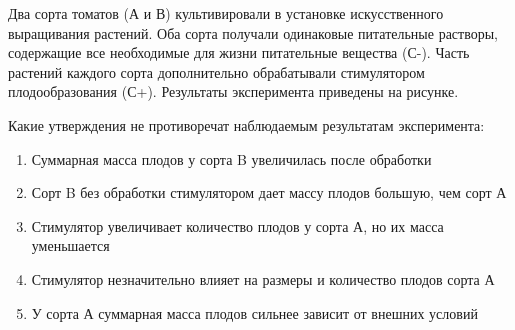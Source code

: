 
Два сорта томатов (А и В) культивировали в
установке искусственного выращивания растений. Оба сорта получали одинаковые
питательные растворы, содержащие все необходимые для жизни питательные вещества
(С-). Часть растений каждого сорта дополнительно обрабатывали стимулятором
плодообразования (С+). Результаты эксперимента приведены на рисунке.


Какие утверждения не противоречат
наблюдаемым результатам эксперимента:

\begin{enumerate}
    \item Суммарная масса плодов у сорта B увеличилась после обработки
    \item Сорт B без обработки стимулятором дает массу плодов большую, чем сорт А
    \item Стимулятор увеличивает количество плодов у сорта А, но их масса уменьшается
    \item Стимулятор незначительно влияет на размеры и количество плодов сорта А
    \item У сорта А суммарная масса плодов сильнее зависит от внешних условий
\end{enumerate}

\explanationSection

